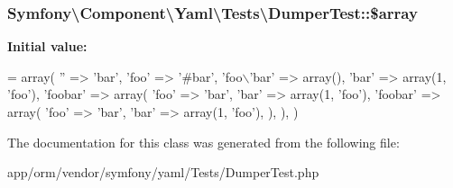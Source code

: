 \subsubsection[{\texorpdfstring{\$array}{$array}}]{\setlength{\rightskip}{0pt plus 5cm}Symfony\textbackslash{}\+Component\textbackslash{}\+Yaml\textbackslash{}\+Tests\textbackslash{}\+Dumper\+Test\+::\$array\hspace{0.3cm}{\ttfamily [protected]}}\hypertarget{classSymfony_1_1Component_1_1Yaml_1_1Tests_1_1DumperTest_ab3b2715b493b946004d5728966071820}{}\label{classSymfony_1_1Component_1_1Yaml_1_1Tests_1_1DumperTest_ab3b2715b493b946004d5728966071820}
{\bfseries Initial value\+:}
\begin{DoxyCode}
= array(
        \textcolor{stringliteral}{''} => \textcolor{stringliteral}{'bar'},
        \textcolor{stringliteral}{'foo'} => \textcolor{stringliteral}{'#bar'},
        \textcolor{stringliteral}{'foo\(\backslash\)'bar'} => array(),
        \textcolor{stringliteral}{'bar'} => array(1, \textcolor{stringliteral}{'foo'}),
        \textcolor{stringliteral}{'foobar'} => array(
            \textcolor{stringliteral}{'foo'} => \textcolor{stringliteral}{'bar'},
            \textcolor{stringliteral}{'bar'} => array(1, \textcolor{stringliteral}{'foo'}),
            \textcolor{stringliteral}{'foobar'} => array(
                \textcolor{stringliteral}{'foo'} => \textcolor{stringliteral}{'bar'},
                \textcolor{stringliteral}{'bar'} => array(1, \textcolor{stringliteral}{'foo'}),
            ),
        ),
    )
\end{DoxyCode}


The documentation for this class was generated from the following file\+:\begin{DoxyCompactItemize}
\item 
app/orm/vendor/symfony/yaml/\+Tests/Dumper\+Test.\+php\end{DoxyCompactItemize}
